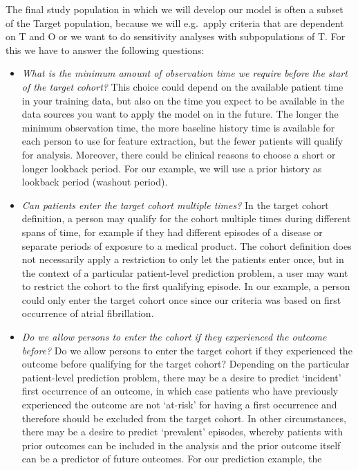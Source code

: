 \documentclass[]{book}
\begin{document}
The final study population in which we will develop our model is often a
subset of the Target population, because we will e.g.~apply criteria
that are dependent on T and O or we want to do sensitivity analyses with
subpopulations of T. For this we have to answer the following questions:

\begin{itemize}
\item
  \emph{What is the minimum amount of observation time we require before
  the start of the target cohort?} This choice could depend on the
  available patient time in your training data, but also on the time you
  expect to be available in the data sources you want to apply the model
  on in the future. The longer the minimum observation time, the more
  baseline history time is available for each person to use for feature
  extraction, but the fewer patients will qualify for analysis.
  Moreover, there could be clinical reasons to choose a short or longer
  lookback period. For our example, we will use a prior history as
  lookback period (washout period).
\item
  \emph{Can patients enter the target cohort multiple times?} In the
  target cohort definition, a person may qualify for the cohort multiple
  times during different spans of time, for example if they had
  different episodes of a disease or separate periods of exposure to a
  medical product. The cohort definition does not necessarily apply a
  restriction to only let the patients enter once, but in the context of
  a particular patient-level prediction problem, a user may want to
  restrict the cohort to the first qualifying episode. In our example, a
  person could only enter the target cohort once since our criteria was
  based on first occurrence of atrial fibrillation.
\item
  \emph{Do we allow persons to enter the cohort if they experienced the
  outcome before?} Do we allow persons to enter the target cohort if
  they experienced the outcome before qualifying for the target cohort?
  Depending on the particular patient-level prediction problem, there
  may be a desire to predict `incident' first occurrence of an outcome,
  in which case patients who have previously experienced the outcome are
  not `at-risk' for having a first occurrence and therefore should be
  excluded from the target cohort. In other circumstances, there may be
  a desire to predict `prevalent' episodes, whereby patients with prior
  outcomes can be included in the analysis and the prior outcome itself
  can be a predictor of future outcomes. For our prediction example, the

\end{itemize}
\end{document}
